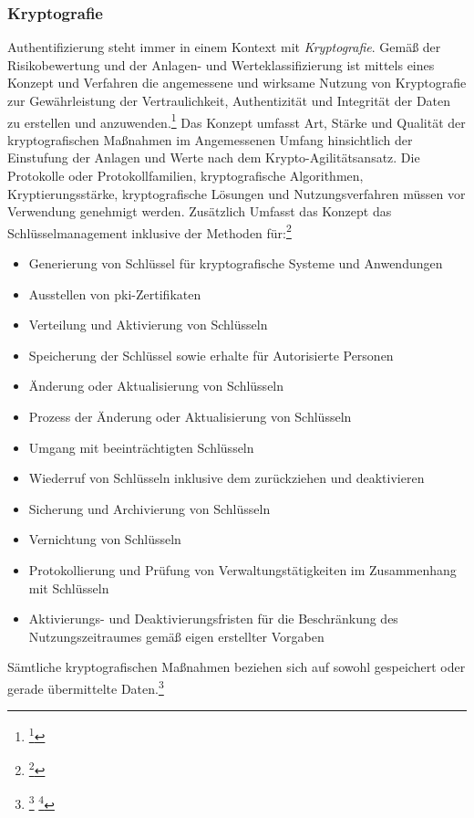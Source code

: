 \documentclass[11pt,a4paper,hidelinks]{article}   %
\begin{document}
            \subsubsection{Kryptografie}
            Authentifizierung steht immer in einem Kontext mit \emph{Kryptografie}. Gemäß der Risikobewertung und der Anlagen- und Werteklassifizierung ist mittels eines Konzept und Verfahren die angemessene und wirksame Nutzung von Kryptografie zur Gewährleistung der Vertraulichkeit, Authentizität und Integrität der Daten zu erstellen und anzuwenden.\footnote{\footcite[Vgl.][, Anhang, Nummer 9.1.]{EU2024-2690}} Das Konzept umfasst Art, Stärke und Qualität der kryptografischen Maßnahmen im Angemessenen Umfang hinsichtlich der Einstufung der Anlagen und Werte nach dem Krypto-Agilitätsansatz. Die Protokolle oder Protokollfamilien, kryptografische Algorithmen, Kryptierungsstärke, kryptografische Lösungen und Nutzungsverfahren müssen vor Verwendung genehmigt werden. Zusätzlich Umfasst das Konzept das Schlüsselmanagement inklusive der Methoden für:\footnote{\footcite[Vgl.][, Anhang, Nummer 9.2.]{EU2024-2690}}
            \begin{itemize}
                \item Generierung von Schlüssel für kryptografische Systeme und Anwendungen
                \item Ausstellen von \gls{pki}-Zertifikaten
                \item Verteilung und Aktivierung von Schlüsseln
                \item Speicherung der Schlüssel sowie erhalte für Autorisierte Personen
                \item Änderung oder Aktualisierung von Schlüsseln
                \item Prozess der Änderung oder Aktualisierung von Schlüsseln
                \item Umgang mit beeinträchtigten Schlüsseln
                \item Wiederruf von Schlüsseln inklusive dem zurückziehen und deaktivieren
                \item Sicherung und Archivierung von Schlüsseln
                \item Vernichtung von Schlüsseln
                \item Protokollierung und Prüfung von Verwaltungstätigkeiten im Zusammenhang mit Schlüsseln
                \item Aktivierungs- und Deaktivierungsfristen für die Beschränkung des Nutzungszeitraumes gemäß eigen erstellter Vorgaben
            \end{itemize}Sämtliche kryptografischen Maßnahmen beziehen sich auf sowohl gespeichert oder gerade übermittelte Daten.\footnote{
                \footcite[Vgl.][, Anhang, Nummer 9.2.]{EU2024-2690}
                \footcite[Vgl.][, §30 Absatz 2, Nummer 8]{NIS2UmsuCG} %
            }
            
\end{document}
